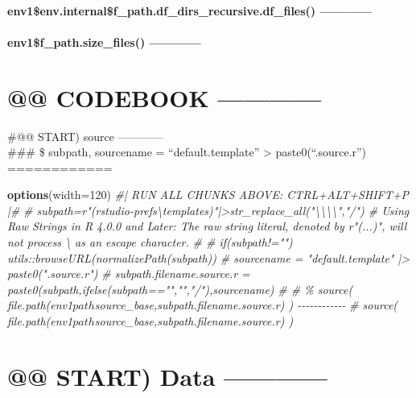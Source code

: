 \documentclass[
]{article}
\newenvironment{Shaded}{\begin{snugshade}}{\end{snugshade}}
\newcommand{\AttributeTok}[1]{\textcolor[rgb]{0.13,0.29,0.53}{#1}}
\newcommand{\CommentTok}[1]{\textcolor[rgb]{0.56,0.35,0.01}{\textit{#1}}}
\newcommand{\DecValTok}[1]{\textcolor[rgb]{0.00,0.00,0.81}{#1}}
\newcommand{\FunctionTok}[1]{\textcolor[rgb]{0.13,0.29,0.53}{\textbf{#1}}}
\newcommand{\NormalTok}[1]{#1}
\begin{document}
\hypertarget{env1env.internalf_path.df_dirs_recursive.df_files}{%
\paragraph{env1\$env.internal\$f\_path.df\_dirs\_recursive.df\_files()
------------}\label{env1env.internalf_path.df_dirs_recursive.df_files}}

\hypertarget{env1f_path.size_files}{%
\paragraph{env1\$f\_path.size\_files()
------------}\label{env1f_path.size_files}}

\hypertarget{codebook}{%
\section{@@ CODEBOOK ------------}\label{codebook}}

\#@@ START) source ------------\\
\#\#\# \$ subpath, sourcename = ``default.template''
\textbar\textgreater{} paste0(``.source.r'') ============

\begin{Shaded}
\begin{Highlighting}[]
\FunctionTok{options}\NormalTok{(}\AttributeTok{width=}\DecValTok{120}\NormalTok{)}
\CommentTok{\#| RUN ALL CHUNKS ABOVE: CTRL+ALT+SHIFT+P |\#}
\CommentTok{\# subpath=r"(rstudio{-}prefs\textbackslash{}templates)"|\textgreater{}str\_replace\_all("\textbackslash{}\textbackslash{}\textbackslash{}\textbackslash{}","/")  \# Using Raw Strings in R 4.0.0 and Later: The raw string literal, denoted by r"(...)", will not process \textbackslash{} as an escape character.}
\CommentTok{\# \# if(subpath!="") utils::browseURL(normalizePath(subpath))}
\CommentTok{\# sourcename = "default.template" |\textgreater{} paste0(".source.r")}
\CommentTok{\# subpath.filename.source.r = paste0(subpath,ifelse(subpath=="","","/"),sourcename)}
\CommentTok{\# \# \% source( file.path(env1$path$source\_base,subpath.filename.source.r) ) {-}{-}{-}{-}{-}{-}{-}{-}{-}{-}{-}{-}  }
\CommentTok{\# source( file.path(env1$path$source\_base,subpath.filename.source.r) )}
\end{Highlighting}
\end{Shaded}

\hypertarget{start-data}{%
\section{@@ START) Data ------------}\label{start-data}}
\end{document}
